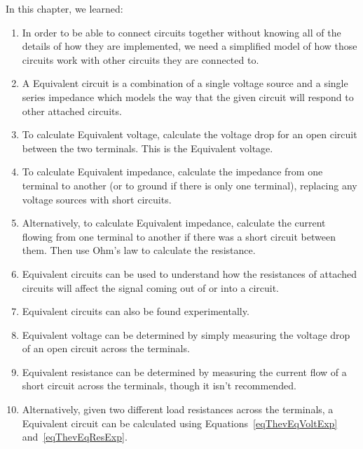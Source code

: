 \reviewsection

In this chapter, we learned:

\begin{enumerate}
\item In order to be able to connect circuits together without knowing all of the details of how they are implemented, we need a simplified model of how those circuits work with other circuits they are connected to.
\item A \thev Equivalent circuit is a combination of a single voltage source and a single series impedance which models the way that the given circuit will respond to other attached circuits.
\item To calculate \thev Equivalent voltage, calculate the voltage drop for an open circuit between the two terminals.  This is the \thev Equivalent voltage.
\item To calculate \thev Equivalent impedance, calculate the impedance from one terminal to another (or to ground if there is only one terminal), replacing any voltage sources with short circuits.
\item Alternatively, to calculate \thev Equivalent impedance, calculate the current flowing from one terminal to another if there was a short circuit between them.  Then use Ohm's law to calculate the resistance.
\item \thev Equivalent circuits can be used to understand how the resistances of attached circuits will affect the signal coming out of or into a  circuit.
\item \thev Equivalent circuits can also be found experimentally.  
\item \thev Equivalent voltage can be determined by simply measuring the voltage drop of an open circuit across the terminals.
\item \thev Equivalent resistance can be determined by measuring the current flow of a short circuit across the terminals, though it isn't recommended.
\item Alternatively, given two different load resistances across the terminals, a \thev Equivalent circuit can be calculated using Equations~\ref{eqThevEqVoltExp} and~\ref{eqThevEqResExp}.
\end{enumerate}

\applysection


